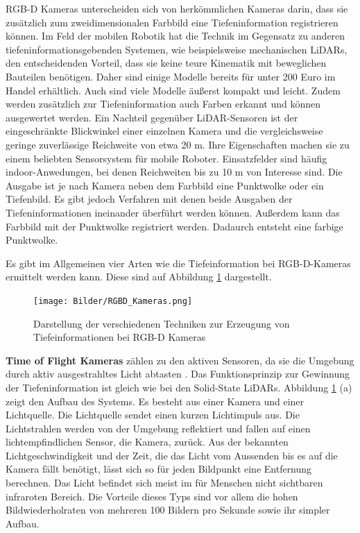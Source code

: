 RGB-D Kameras unterscheiden sich von herkömmlichen Kameras darin, dass sie zu\-sätz\-lich zum zweidimensionalen Farbbild eine Tiefeninformation registrieren können. Im Feld der mobilen Robotik hat die Technik im Gegensatz zu anderen tiefeninformationsgebenden Systemen, wie beispielsweise mechanischen LiDARs, den entscheidenden Vorteil, dass sie keine teure Kinematik mit beweglichen Bauteilen benötigen. Daher sind einige Modelle bereits für unter 200 Euro im Handel erhältlich. Auch sind viele Modelle äußerst kompakt und leicht. Zudem werden zusätzlich zur Tiefeninformation auch Farben erkannt und können ausgewertet werden. Ein Nachteil gegenüber LiDAR-Sensoren ist der eingeschränkte Blickwinkel einer einzelnen Kamera und die ver\-gleichs\-wei\-se geringe zuverlässige Reichweite von etwa 20 m. Ihre Eigenschaften machen sie zu einem beliebten Sensorsystem für mobile Roboter. Einsatzfelder sind häufig indoor-Anwedungen, bei denen Reichweiten bis zu 10 m von Interesse sind. Die Ausgabe ist je nach Kamera neben dem Farbbild eine Punktwolke oder ein Tiefenbild. Es gibt jedoch Verfahren mit denen beide Ausgaben der Tiefeninformationen ineinander überführt werden können. Außerdem kann das Farbbild mit der Punktwolke registriert werden. Dadaurch entsteht eine farbige Punktwolke.

Es gibt im Allgemeinen vier Arten wie die Tiefeinformation bei RGB-D-Kameras ermittelt werden kann. Diese sind auf Abbildung \ref{fig:RGBD_Kameras} dargestellt. 

\begin{figure}
	\centering
	\texttt{[image: Bilder/RGBD\_Kameras.png]}
	\caption{Darstellung der verschiedenen Techniken zur Erzeugung von Tiefeinformationen bei RGB-D Kameras}
	\label{fig:RGBD_Kameras}
\end{figure}
 
\textbf{Time of Flight Kameras} zählen zu den aktiven Sensoren, da sie die Umgebung durch aktiv ausgestrahltes Licht abtasten \cite{Shao2014}. Das Funktionsprinzip zur Gewinnung der Tiefeninformation ist gleich wie bei den Solid-State LiDARs. Abbildung \ref{fig:RGBD_Kameras} (a) zeigt den Aufbau des Systems. Es besteht aus einer Kamera und einer Lichtquelle. Die Lichtquelle sendet einen kurzen Lichtimpuls aus. Die Lichtstrahlen werden von der Umgebung reflektiert und fallen auf einen lichtempfindlichen Sensor, die Kamera, zurück. Aus der bekannten Lichtgeschwindigkeit und der Zeit, die das Licht vom Aussenden bis es auf die Kamera fällt benötigt, lässt sich so für jeden Bildpunkt eine Entfernung berechnen. Das Licht befindet sich meist im für Menschen nicht sichtbaren infraroten Bereich. Die Vorteile dieses Typs sind vor allem die hohen Bildwiederholraten von mehreren 100 Bildern pro Sekunde sowie ihr simpler Aufbau.
 
